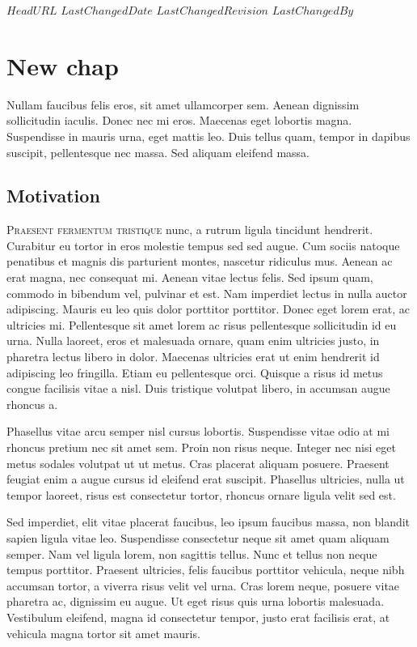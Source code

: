 \svnidlong
{$HeadURL$}
{$LastChangedDate$}
{$LastChangedRevision$}
{$LastChangedBy$}

\chapter{New chap}

\begin{introduction}
  Nullam faucibus felis eros, sit amet ullamcorper sem. Aenean dignissim
  sollicitudin iaculis. Donec nec mi eros. Maecenas eget lobortis
  magna. Suspendisse in mauris urna, eget mattis leo. Duis tellus quam, tempor
  in dapibus suscipit, pellentesque nec massa. Sed aliquam eleifend massa.
\end{introduction}



\section{Motivation}

\lettrine[nindent=-3pt]{P}{raesent fermentum tristique} nunc, a rutrum ligula
tincidunt hendrerit. Curabitur eu tortor in eros molestie tempus sed sed
augue. Cum sociis natoque penatibus et magnis dis parturient montes, nascetur
ridiculus mus. Aenean ac erat magna, nec consequat mi. Aenean vitae lectus
felis. Sed ipsum quam, commodo in bibendum vel, pulvinar et est. Nam imperdiet
lectus in nulla auctor adipiscing. Mauris eu leo quis dolor porttitor
porttitor. Donec eget lorem erat, ac ultricies mi. Pellentesque sit amet lorem
ac risus pellentesque sollicitudin id eu urna. Nulla laoreet, eros et malesuada
ornare, quam enim ultricies justo, in pharetra lectus libero in dolor. Maecenas
ultricies erat ut enim hendrerit id adipiscing leo fringilla. Etiam eu
pellentesque orci. Quisque a risus id metus congue facilisis vitae a nisl. Duis
tristique volutpat libero, in accumsan augue rhoncus a.

Phasellus vitae arcu semper nisl cursus lobortis. Suspendisse vitae odio at mi
rhoncus pretium nec sit amet sem. Proin non risus neque. Integer nec nisi eget
metus sodales volutpat ut ut metus. Cras placerat aliquam posuere. Praesent
feugiat enim a augue cursus id eleifend erat suscipit. Phasellus ultricies,
nulla ut tempor laoreet, risus est consectetur tortor, rhoncus ornare ligula
velit sed est.

Sed imperdiet, elit vitae placerat faucibus, leo ipsum faucibus massa, non
blandit sapien ligula vitae leo. Suspendisse consectetur neque sit amet quam
aliquam semper. Nam vel ligula lorem, non sagittis tellus. Nunc et tellus non
neque tempus porttitor. Praesent ultricies, felis faucibus porttitor vehicula,
neque nibh accumsan tortor, a viverra risus velit vel urna. Cras lorem neque,
posuere vitae pharetra ac, dignissim eu augue. Ut eget risus quis urna lobortis
malesuada. Vestibulum eleifend, magna id consectetur tempor, justo erat
facilisis erat, at vehicula magna tortor sit amet mauris.

